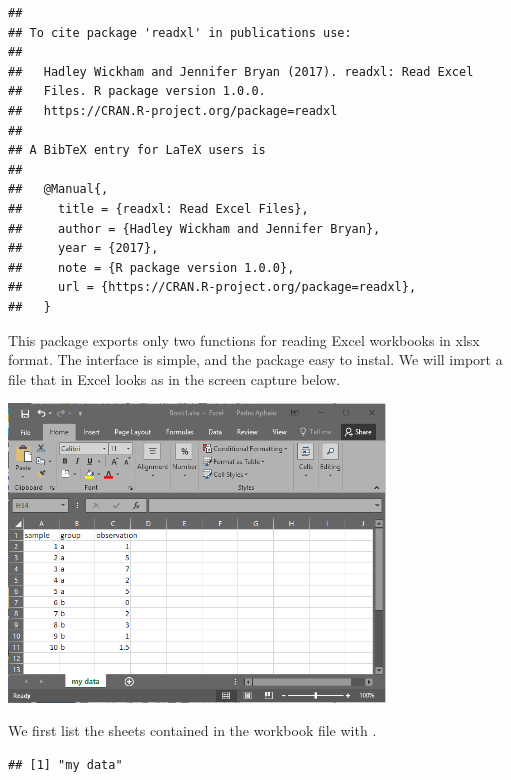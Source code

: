 \documentclass[krantz2,ChapterTOCs]{krantz}\usepackage{knitr}
\begin{document}
\begin{knitrout}\footnotesize
{}\color{fgcolor}\begin{kframe}
\begin{alltt}
\hlstd{(} \hlstd{=} \hlstd{)}
\end{alltt}
\begin{verbatim}
## 
## To cite package 'readxl' in publications use:
## 
##   Hadley Wickham and Jennifer Bryan (2017). readxl: Read Excel
##   Files. R package version 1.0.0.
##   https://CRAN.R-project.org/package=readxl
## 
## A BibTeX entry for LaTeX users is
## 
##   @Manual{,
##     title = {readxl: Read Excel Files},
##     author = {Hadley Wickham and Jennifer Bryan},
##     year = {2017},
##     note = {R package version 1.0.0},
##     url = {https://CRAN.R-project.org/package=readxl},
##   }
\end{verbatim}
\end{kframe}
\end{knitrout}

This package exports only two functions for reading Excel workbooks in xlsx format. The interface is simple, and the package easy to instal. We will import a file that in Excel looks as in the screen capture below.

\begin{center}
\includegraphics[width=0.75\textwidth]{figures/Book1-xlsx.png}
\end{center}

We first list the sheets contained in the workbook file with .
\begin{knitrout}\footnotesize
{}\color{fgcolor}\begin{kframe}
\begin{alltt}
 \hlkwb{<-} \hlstd{(}\hlstd{)}
\end{alltt}
\begin{verbatim}
## [1] "my data"
\end{verbatim}
\end{kframe}
\end{knitrout}
\end{document}
